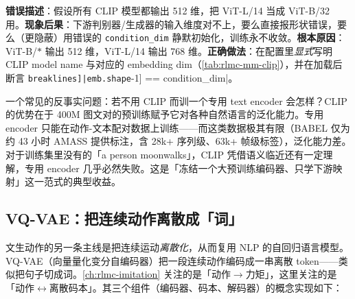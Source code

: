 \begin{pitfall}
\textbf{错误描述}：假设所有 CLIP 模型都输出 512 维，把 ViT-L/14 当成 ViT-B/32 用。\textbf{现象后果}：下游判别器/生成器的输入维度对不上，要么直接报形状错误，要么（更隐蔽）用错误的 \verb|condition_dim| 静默初始化，训练永不收敛。\textbf{根本原因}：ViT-B/$\ast$ 输出 512 维，ViT-L/14 输出 768 维。\textbf{正确做法}：在配置里\emph{显式}写明 CLIP model name 与对应的 embedding dim（\cref{tab:rlmc-mm-clip}），并在加载后断言 \Verb[breaklines]|emb.shape[-1] == condition_dim|。
\end{pitfall}

\begin{insight}\label{ins:rlmc-mm-whyclip}
一个常见的反事实问题：若不用 CLIP 而训一个专用 text encoder 会怎样？CLIP 的优势在于 400M 图文对的预训练赋予它对各种自然语言的泛化能力。专用 encoder 只能在动作-文本配对数据上训练——而这类数据极其有限（BABEL 仅为约 43 小时 AMASS 提供标注，含 28k+ 序列级、63k+ 帧级标签），泛化能力差。对于训练集里没有的「a person moonwalks」，CLIP 凭借语义临近还有一定理解，专用 encoder 几乎必然失败。这是「冻结一个大预训练编码器、只学下游映射」这一范式的典型收益。
\end{insight}

\subsection{VQ-VAE：把连续动作离散成「词」}
\label{sec:rlmc-mm-vqvae}

文生动作的另一条主线是把连续运动\emph{离散化}，从而复用 NLP 的自回归语言模型。VQ-VAE（向量量化变分自编码器）把一段连续动作编码成一串离散 token——类似把句子切成词。\cref{ch:rlmc-imitation} 关注的是「动作$\to$力矩」，这里关注的是「动作$\leftrightarrow$离散码本」。其三个组件（编码器、码本、解码器）的概念实现如下：

